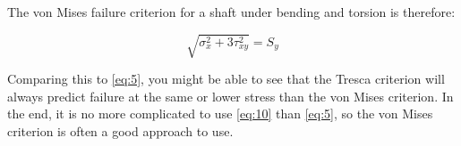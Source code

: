 The von Mises failure criterion for a shaft under bending and torsion is
therefore:

\begin{equation}
\sqrt{\sigma_x^2 + 3\tau_{xy}^2} = S_y
\label{eq:10}
\end{equation}

Comparing this to \cref{eq:5}, you might be able to see that the Tresca
criterion will always predict failure at the same or lower stress than the von
Mises criterion. In the end, it is no more complicated to use \cref{eq:10} than
\cref{eq:5}, so the von Mises criterion is often a good approach to use.